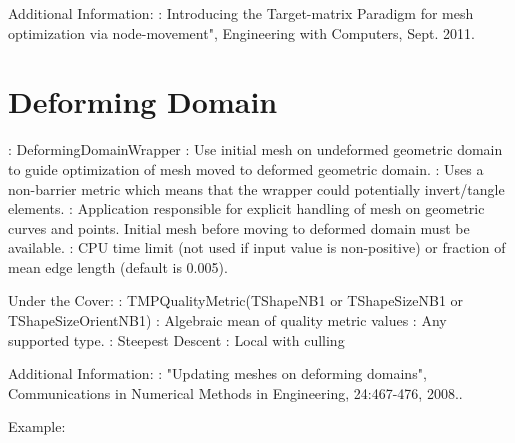 \noindent Additional Information: \newline
{}: Introducing the Target-matrix Paradigm for mesh optimization via node-movement", Engineering with Computers, Sept. 2011.\newline

\newpage
\section{Deforming Domain} \label{sec:DeformingDomain}

: DeformingDomainWrapper \newline
{}:  Use initial mesh on undeformed geometric domain
to guide optimization of mesh moved to deformed geometric domain.  \newline
{}: Uses a non-barrier metric which means that the
wrapper could potentially invert/tangle elements.  \newline
{}:  Application responsible for explicit handling of mesh on geometric curves and points.  Initial mesh before moving to deformed domain must be available.\newline
{}: CPU time limit (not used if input
value is non-positive) or fraction of mean edge length (default is 0.005). \newline \newline

\noindent Under the Cover: \newline
{}: TMPQualityMetric(TShapeNB1 or TShapeSizeNB1 or TShapeSizeOrientNB1) \newline
{}: Algebraic mean of quality metric values \newline
{}: Any supported type. \newline
{}: Steepest Descent \newline
{}: Local with culling \newline

\noindent Additional Information: \newline
{}: "Updating meshes on deforming domains",  Communications in Numerical Methods in Engineering, 24:467-476, 2008..\newline

\noindent Example: \newline

